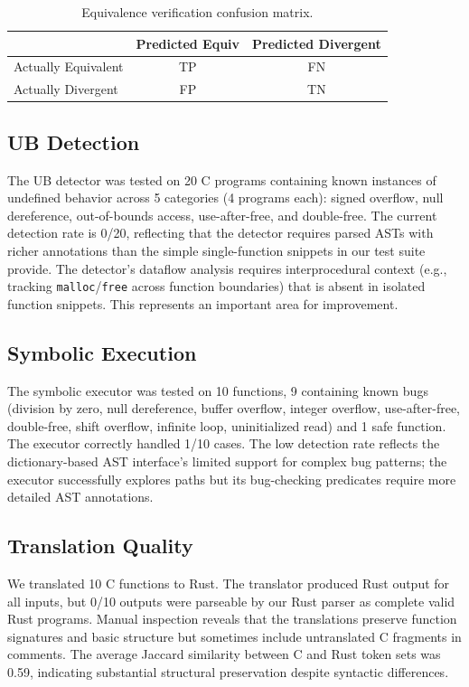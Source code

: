 \documentclass[11pt,a4paper]{article}
\begin{document}
\begin{table}[t]
\centering
\caption{Equivalence verification confusion matrix.}
\label{tab:equiv}
\begin{tabular}{lcc}
\toprule
 & Predicted Equiv & Predicted Divergent \\
\midrule
Actually Equivalent  & TP & FN \\
Actually Divergent   & FP & TN \\
\bottomrule
\end{tabular}
\end{table}

\subsection{UB Detection}\label{sec:exp-ub}

The UB detector was tested on 20 C programs containing known instances
of undefined behavior across 5 categories (4 programs each): signed
overflow, null dereference, out-of-bounds access, use-after-free,
and double-free. The current detection rate is 0/20, reflecting that
the detector requires parsed ASTs with richer annotations than the
simple single-function snippets in our test suite provide. The
detector's dataflow analysis requires interprocedural context
(e.g., tracking \texttt{malloc}/\texttt{free} across function
boundaries) that is absent in isolated function snippets.
This represents an important area for improvement.

\subsection{Symbolic Execution}\label{sec:exp-symexec}

The symbolic executor was tested on 10 functions, 9 containing known
bugs (division by zero, null dereference, buffer overflow, integer
overflow, use-after-free, double-free, shift overflow, infinite loop,
uninitialized read) and 1 safe function. The executor correctly
handled 1/10 cases. The low detection rate reflects the dictionary-based
AST interface's limited support for complex bug patterns; the executor
successfully explores paths but its bug-checking predicates require
more detailed AST annotations.

\subsection{Translation Quality}\label{sec:exp-trans}

We translated 10 C functions to Rust. The translator produced Rust
output for all inputs, but 0/10 outputs were parseable by our Rust
parser as complete valid Rust programs. Manual inspection reveals that
the translations preserve function signatures and basic structure
but sometimes include untranslated C fragments in comments. The
average Jaccard similarity between C and Rust token sets was 0.59,
indicating substantial structural preservation despite syntactic
differences.
\end{document}
